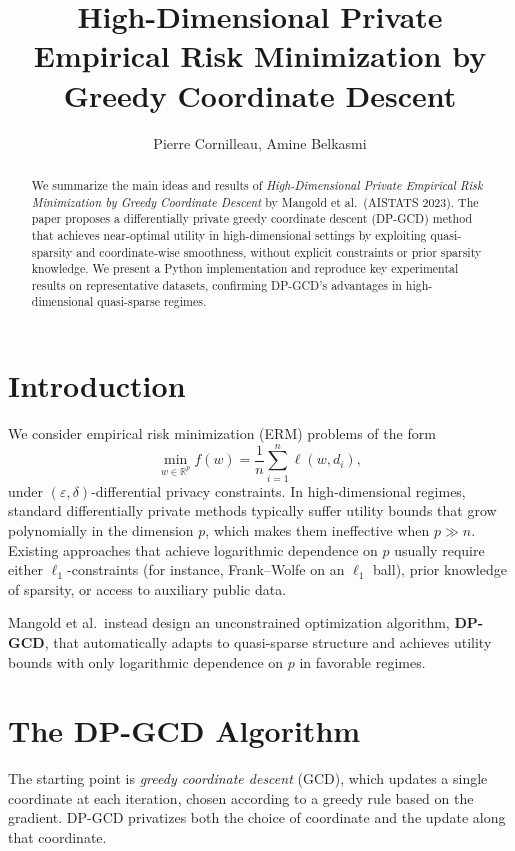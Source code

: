 \documentclass[11pt,a4paper]{article}
\title{High-Dimensional Private Empirical Risk Minimization by Greedy Coordinate Descent}
\author{Pierre Cornilleau, Amine Belkasmi}
\date{}
\begin{document}
\maketitle

\begin{abstract}
We summarize the main ideas and results of \emph{High-Dimensional Private Empirical Risk Minimization by Greedy Coordinate Descent} by Mangold et al.\ (AISTATS 2023). The paper proposes a differentially private greedy coordinate descent (DP-GCD) method that achieves near-optimal utility in high-dimensional settings by exploiting quasi-sparsity and coordinate-wise smoothness, without explicit constraints or prior sparsity knowledge. We present a Python implementation and reproduce key experimental results on representative datasets, confirming DP-GCD's advantages in high-dimensional quasi-sparse regimes.
\end{abstract}

\section{Introduction}

We consider empirical risk minimization (ERM) problems of the form
\[
\min_{w \in \mathbb{R}^p} f(w) = \frac{1}{n} \sum_{i=1}^{n} \ell(w, d_i),
\]
under $(\varepsilon, \delta)$-differential privacy constraints. In high-dimensional regimes, standard differentially private methods typically suffer utility bounds that grow polynomially in the dimension $p$, which makes them ineffective when $p \gg n$. Existing approaches that achieve logarithmic dependence on $p$ usually require either $\ell_1$-constraints (for instance, Frank--Wolfe on an $\ell_1$ ball), prior knowledge of sparsity, or access to auxiliary public data.

Mangold et al.\ instead design an unconstrained optimization algorithm, \textbf{DP-GCD}, that automatically adapts to quasi-sparse structure and achieves utility bounds with only logarithmic dependence on $p$ in favorable regimes.

\section{The DP-GCD Algorithm}

The starting point is \emph{greedy coordinate descent} (GCD), which updates a single coordinate at each iteration, chosen according to a greedy rule based on the gradient. DP-GCD privatizes both the choice of coordinate and the update along that coordinate.
\end{document}
